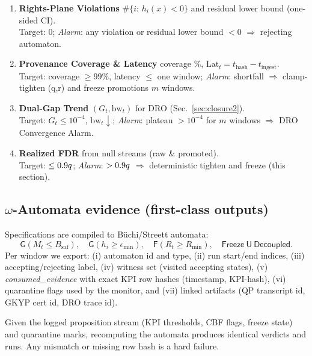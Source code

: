 \begin{constbox}
\begin{enumerate}[leftmargin=*]
Target: $0$ chatter; \emph{Alarm}: any violation $\Rightarrow$ switching-stability action (Sec.~\ref{thm:switch-stab}).
\item \textbf{Rights-Plane Violations} $\#\{i:\,h_i(x)<0\}$ and residual lower bound (one-sided CI). \\
Target: $0$; \emph{Alarm}: any violation or residual lower bound $<0$ $\Rightarrow$ rejecting automaton.
\item \textbf{Provenance Coverage \& Latency} coverage \%, $\mathrm{Lat}_t=t_{\text{hash}}{-}t_{\text{ingest}}$. \\
Target: coverage $\ge99\%$, latency $\le$ one window; \emph{Alarm}: shortfall $\Rightarrow$ clamp-tighten (q,r) and freeze promotions $m$ windows.
\item \textbf{Dual-Gap Trend} $(G_t,\mathrm{bw}_t)$ for DRO (Sec.~\ref{sec:closure2}). \\
Target: $G_t\le 10^{-4}$, $\mathrm{bw}_t\downarrow$; \emph{Alarm}: plateau $>10^{-4}$ for $m$ windows $\Rightarrow$ \textsf{DRO Convergence Alarm}.
\item \textbf{Realized FDR} from null streams (raw \& promoted). \\
Target: $\le 0.9q$; \emph{Alarm}: $>0.9q$ $\Rightarrow$ deterministic tighten and freeze (this section).
\end{enumerate}
\end{constbox}

\subsection*{$\omega$-Automata evidence (first-class outputs)}
Specifications are compiled to Büchi/Streett automata:
\[
\textsf{G}(M_t\!\le\!B_{\mathrm{saf}}),\quad
\textsf{G}(h_i\!\ge\!\epsilon_{\min}),\quad
\textsf{F}(R_t\!\ge\!R_{\min}),\quad
\textsf{Freeze}\ \textsf{U}\ \textsf{Decoupled}.
\]
Per window we export:
(i) automaton id and type, (ii) run start/end indices, (iii) accepting/rejecting label, (iv) witness set (visited accepting states), (v) \emph{consumed\_evidence} with exact KPI row hashes (timestamp, KPI-hash), (vi) quarantine flags used by the monitor, and (vii) linked artifacts (QP transcript id, GKYP cert id, DRO trace id).

\begin{proposition}\label{prop:omega-contract}
\emph{}
Given the logged proposition stream (KPI thresholds, CBF flags, freeze state) and \textsf{quarantine} marks, recomputing the automata produces identical verdicts and runs. Any mismatch or missing row hash is a hard failure.
\end{proposition}

